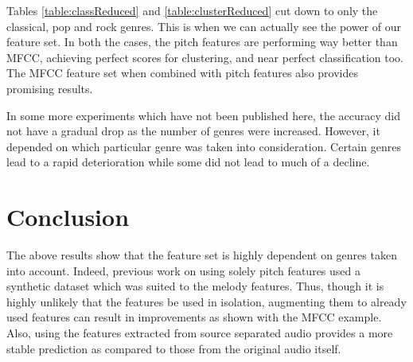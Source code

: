 \documentclass[12pt,journal,compsoc]{IEEEtran}
\begin{document}
\begin{table}[H]
	\centering
    \caption{Clustering Score for specific genres}
    \label{table:clusterReduced}
\end{table}

Tables \ref{table:classReduced} and \ref{table:clusterReduced} cut down to only the classical, pop and rock genres. This is when we can actually see the power of our feature set. In both the cases, the pitch features are performing way better than MFCC, achieving perfect scores for clustering, and near perfect classification too. The MFCC feature set when combined with pitch features also provides promising results. 

In some more experiments which have not been published here, the accuracy did not have a gradual drop as the number of genres were increased. However, it depended on which particular genre was taken into consideration. Certain genres lead to a rapid deterioration while some did not lead to much of a decline.

\section{Conclusion}

The above results show that the feature set is highly dependent on genres taken into account. Indeed, previous work on using solely pitch features \cite{salamon01} used a synthetic dataset which was suited to the melody features. Thus, though it is highly unlikely that the features be used in isolation, augmenting them to already used features can result in improvements as shown with the MFCC example. Also, using the features extracted from source separated audio provides a more stable prediction as compared to those from the    original audio itself.
\end{document}
